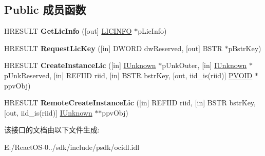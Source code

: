 \subsection*{Public 成员函数}
\begin{DoxyCompactItemize}
\item 
\mbox{\label{interface_i_class_factory2_a2dc65831212f006410e89cc6e5556716}} 
H\+R\+E\+S\+U\+LT {\bfseries Get\+Lic\+Info} (\mbox{[}out\mbox{]} \hyperlink{struct_i_class_factory2_1_1tag_l_i_c_i_n_f_o}{L\+I\+C\+I\+N\+FO} $\ast$p\+Lic\+Info)
\item 
\mbox{\label{interface_i_class_factory2_ace8a7bfcc46652ed80f169da3fe47ab7}} 
H\+R\+E\+S\+U\+LT {\bfseries Request\+Lic\+Key} (\mbox{[}in\mbox{]} D\+W\+O\+RD dw\+Reserved, \mbox{[}out\mbox{]} B\+S\+TR $\ast$p\+Bstr\+Key)
\item 
\mbox{\label{interface_i_class_factory2_a938a2171c3bfcf8e4575d6c0061b8bf2}} 
H\+R\+E\+S\+U\+LT {\bfseries Create\+Instance\+Lic} (\mbox{[}in\mbox{]} \hyperlink{interface_i_unknown}{I\+Unknown} $\ast$p\+Unk\+Outer, \mbox{[}in\mbox{]} \hyperlink{interface_i_unknown}{I\+Unknown} $\ast$p\+Unk\+Reserved, \mbox{[}in\mbox{]} R\+E\+F\+I\+ID riid, \mbox{[}in\mbox{]} B\+S\+TR bstr\+Key, \mbox{[}out, iid\+\_\+is(riid)\mbox{]} \hyperlink{interfacevoid}{P\+V\+O\+ID} $\ast$ppv\+Obj)
\item 
\mbox{\label{interface_i_class_factory2_ad9301b74f7330bfc0aca38f499168c4a}} 
H\+R\+E\+S\+U\+LT {\bfseries Remote\+Create\+Instance\+Lic} (\mbox{[}in\mbox{]} R\+E\+F\+I\+ID riid, \mbox{[}in\mbox{]} B\+S\+TR bstr\+Key, \mbox{[}out, iid\+\_\+is(riid)\mbox{]} \hyperlink{interface_i_unknown}{I\+Unknown} $\ast$$\ast$ppv\+Obj)
\end{DoxyCompactItemize}


该接口的文档由以下文件生成\+:\begin{DoxyCompactItemize}
\item 
E\+:/\+React\+O\+S-\/0../sdk/include/psdk/ocidl.\+idl\end{DoxyCompactItemize}
